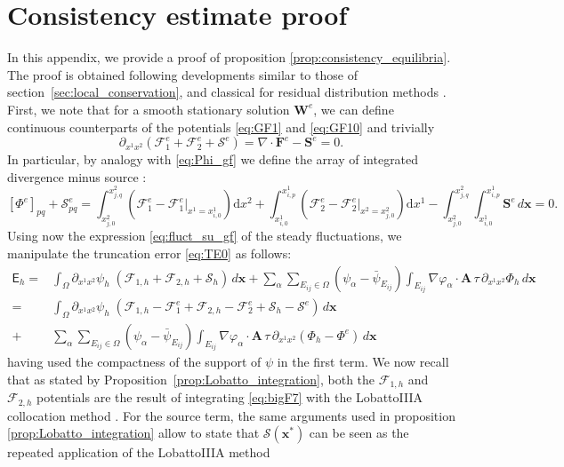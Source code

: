 \documentclass[a4paper,10pt]{article}
\begin{document}
\section{Consistency estimate proof}\label{app:consistency}
In this appendix, we provide a proof of proposition \ref{prop:consistency_equilibria}. The proof is obtained  following developments similar to those of section~\ref{sec:local_conservation},
and classical for residual distribution methods \cite{AR:17,amr2025}. First, we note that for a smooth stationary solution $\mathbf{W}^e$, we can  define continuous counterparts of the 
potentials \eqref{eq:GF1} and \eqref{eq:GF10} and  trivially
$$
\partial_{x^1x^2}(\mathcal{F}_{1}^e  +  \mathcal{F}_{2}^e +  \mathcal{S}^e ) = \nabla\cdot\mathbf{F}^e-\mathbf{S}^e =0.
$$
In particular, by analogy with \eqref{eq:Phi_gf} we define the array of integrated divergence minus source :  
$$
[\Phi^e]_{pq} + \mathcal{S}^e_{pq}  = \int_{x^2_{j,0} }^{x^2_{j,q} } (\mathcal{F}_{1}^e-\mathcal{F}_{1}^e|_{x^1=x^1_{i,0}})\mathrm{d}x^2
+ \int_{x^1_{i,0} }^{x^1_{i,p} } (\mathcal{F}_{2}^e-\mathcal{F}_{2}^e|_{x^2=x^2_{j,0}})\mathrm{d}x^1
-\int_{x^2_{j,0} }^{x^2_{j,q} }\int_{x^1_{i,0} }^{x^1_{i,p} }\mathbf{S}^e\,d\mathbf{x} = 0.
$$
Using now  the expression \eqref{eq:fluct_su_gf} of the steady fluctuations, we  manipulate the truncation error \eqref{eq:TE0} as follows:
$$
\begin{aligned}
\mathsf{E}_h =& \int_{\Omega}\partial_{x^1x^2}\psi_{h}  \;( \mathcal{F}_{1,h}  +  \mathcal{F}_{2,h} +  \mathcal{S}_{h}   )\,d\mathbf{x} 
+ \sum_\alpha\sum_{E_{ij}\in\Omega}  (\psi_{\alpha} -\bar \psi_{E_{ij}}) \int_{E_{ij}} \nabla\varphi_\alpha\cdot \mathbf{A}\,\tau\, 
\partial_{x^1x^2}\Phi_h \,d\mathbf{x} \\
=&  \int_{\Omega}\partial_{x^1x^2}\psi_{h}  \;( \mathcal{F}_{1,h}  -\mathcal{F}_{1}^e +  \mathcal{F}_{2,h} -\mathcal{F}_{2}^e+  \mathcal{S}_{h} - \mathcal{S}^e   )\,d\mathbf{x}  \\
+& \sum_\alpha\sum_{E_{ij}\in\Omega}  (\psi_{\alpha} -\bar \psi_{E_{ij}}) \int_{E_{ij}} \nabla\varphi_\alpha\cdot \mathbf{A}\,\tau\, 
\partial_{x^1x^2}(\Phi_h - \Phi^e) \,d\mathbf{x} 
\end{aligned}
$$ 
having used the compactness of the support of $\psi$  in the first term.
We now  recall that as stated by  Proposition~\ref{prop:Lobatto_integration},  both the $\mathcal{F}_{1,h}$ and $\mathcal{F}_{2,h}$ potentials are
the result of integrating  \eqref{eq:bigF7} with the  LobattoIIIA collocation method \cite{Hairer1993}.
For the source term, the same arguments used in proposition \ref{prop:Lobatto_integration} allow to state that $\mathcal{S}(\mathbf{x^*})$ can be seen as the repeated application of the LobattoIIIA method 
\end{document}

